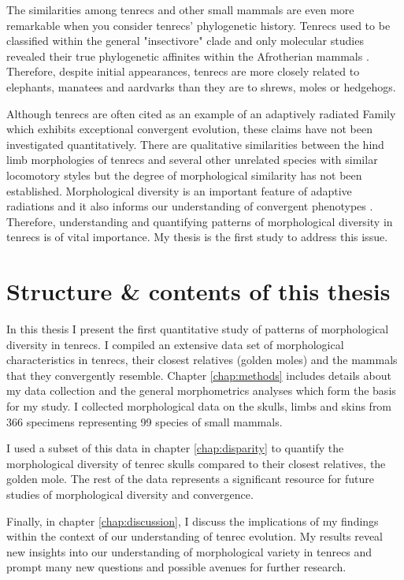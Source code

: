 	The similarities among tenrecs and other small mammals are even more remarkable when you consider tenrecs' phylogenetic history. Tenrecs used to be classified within the general "insectivore" clade and only molecular studies revealed their true phylogenetic affinites within the Afrotherian mammals \citep{Stanhope1998}. Therefore, despite initial appearances, tenrecs are more closely related to elephants, manatees and aardvarks than they are to shrews, moles or hedgehogs. 

	Although tenrecs are often cited as an example of an adaptively radiated Family which exhibits exceptional convergent evolution, these claims have not been investigated quantitatively. There are qualitative similarities between the hind limb morphologies of tenrecs and several other unrelated species with similar locomotory styles \citep{Salton2009} but the degree of morphological similarity has not been established. Morphological diversity is an important feature of adaptive radiations \citep{Losos2010a} and it also informs our understanding of convergent phenotypes \citep{Muschick2012}. Therefore, understanding and quantifying patterns of morphological diversity in tenrecs is of vital importance. My thesis is the first study to address this issue. 

\section{Structure \& contents of this thesis}
	
	In this thesis I present the first quantitative study of patterns of morphological diversity in tenrecs. I compiled an extensive data set of morphological characteristics in tenrecs, their closest relatives (golden moles) and the mammals that they convergently resemble. Chapter \ref{chap:methods} includes details about my data collection and the general morphometrics analyses which form the basis for my study. I collected morphological data on the skulls, limbs and skins from 366 specimens representing 99 species of small mammals. 
	
	I used a subset of this data in chapter \ref{chap:disparity} to quantify the morphological diversity of tenrec skulls compared to their closest relatives, the golden mole. The rest of the data represents a significant resource for future studies of morphological diversity and convergence.
	
	Finally, in chapter \ref{chap:discussion}, I discuss the implications of my findings within the context of our understanding of tenrec evolution.	
 	My results reveal new insights into our understanding of morphological variety in tenrecs and prompt many new questions and possible avenues for further research.


